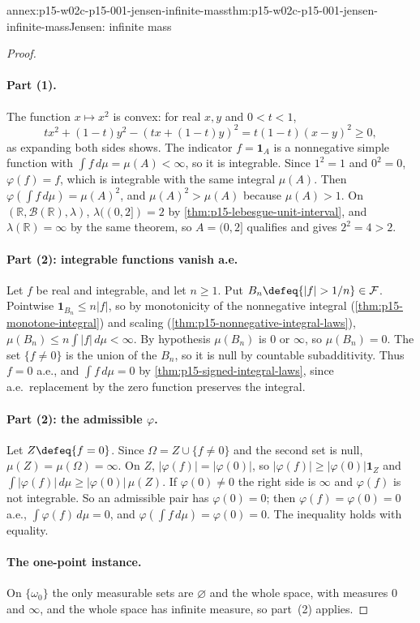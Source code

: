 \begin{annexitem}{annex:p15-w02c-p15-001-jensen-infinite-mass}{thm:p15-w02c-p15-001-jensen-infinite-mass}{Jensen: infinite mass}
\begin{proof}
\paragraph{Part (1).}
The function \(x\mapsto x^2\) is convex: for real \(x,y\) and
\(0<t<1\),
\[
 tx^2+(1-t)y^2-(tx+(1-t)y)^2=t(1-t)(x-y)^2\geq0,
\]
as expanding both sides shows. The indicator \(f=\mathbf1_A\) is a
nonnegative simple function with \(\int f\,d\mu=\mu(A)<\infty\), so it is
integrable. Since \(1^2=1\) and \(0^2=0\), \(\varphi(f)=f\), which is
integrable with the same integral \(\mu(A)\). Then
\(\varphi(\int f\,d\mu)=\mu(A)^2\), and \(\mu(A)^2>\mu(A)\) because
\(\mu(A)>1\). On \((\mathbb R,\mathcal B(\mathbb R),\lambda)\),
\(\lambda((0,2])=2\) by \cref{thm:p15-lebesgue-unit-interval}, and
\(\lambda(\mathbb R)=\infty\) by the same theorem, so \(A=(0,2]\)
qualifies and gives \(2^2=4>2\).

\paragraph{Part (2): integrable functions vanish a.e.}
Let \(f\) be real and integrable, and let \(n\geq1\). Put
\(B_n\defeq\{|f|>1/n\}\in\mathcal F\). Pointwise
\(\mathbf1_{B_n}\leq n|f|\), so by monotonicity of the nonnegative
integral (\cref{thm:p15-monotone-integral}) and scaling
(\cref{thm:p15-nonnegative-integral-laws}),
\(\mu(B_n)\leq n\int|f|\,d\mu<\infty\). By hypothesis \(\mu(B_n)\) is
\(0\) or \(\infty\), so \(\mu(B_n)=0\). The set \(\{f\neq0\}\) is the
union of the \(B_n\), so it is null by countable subadditivity. Thus
\(f=0\) a.e., and \(\int f\,d\mu=0\) by
\cref{thm:p15-signed-integral-laws}, since a.e.\ replacement by the zero
function preserves the integral.

\paragraph{Part (2): the admissible \(\varphi\).}
Let \(Z\defeq\{f=0\}\). Since \(\Omega=Z\cup\{f\neq0\}\) and the second
set is null, \(\mu(Z)=\mu(\Omega)=\infty\). On \(Z\),
\(|\varphi(f)|=|\varphi(0)|\), so
\(|\varphi(f)|\geq|\varphi(0)|\mathbf1_Z\) and
\(\int|\varphi(f)|\,d\mu\geq|\varphi(0)|\,\mu(Z)\). If
\(\varphi(0)\neq0\) the right side is \(\infty\) and \(\varphi(f)\) is not
integrable. So an admissible pair has \(\varphi(0)=0\); then
\(\varphi(f)=\varphi(0)=0\) a.e., \(\int\varphi(f)\,d\mu=0\), and
\(\varphi(\int f\,d\mu)=\varphi(0)=0\). The inequality holds with
equality.

\paragraph{The one-point instance.}
On \(\{\omega_0\}\) the only measurable sets are \(\varnothing\) and the
whole space, with measures \(0\) and \(\infty\), and the whole space has
infinite measure, so part~(2) applies.
\end{proof}
\end{annexitem}


